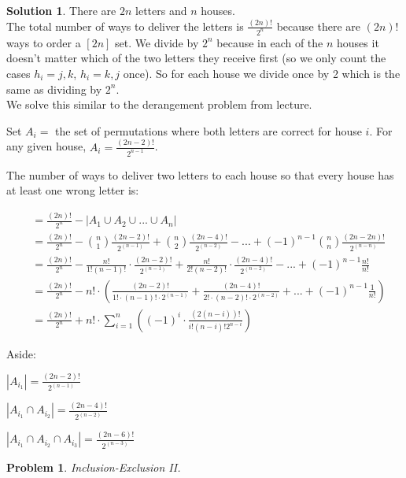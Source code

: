 \documentclass{article}
\newtheorem{problem}{Problem}
\theoremstyle{definition}
\newtheorem*{solution}{Solution}
\begin{document}
\begin{solution}

There are \(2n\) letters and \(n\) houses. \\

The total number of ways to deliver the letters is \(\frac{(2n)!}{2^n}\) because there are \((2n)!\) ways to order a \([2n]\) set. We divide by \(2^n\) because in each of the \(n\) houses it doesn't matter which of the two letters they receive first (so we only count the cases \(h_i={j,k}\), \(h_i={k,j}\) once). So for each house we divide once by 2 which is the same as dividing by \(2^n\). \\

We solve this similar to the derangement problem from lecture.

Set \(A_i=\) the set of permutations where both letters are correct for house \(i\). For any given house, \(A_i=\frac{(2n-2)!}{2^{n-1}}\).

The number of ways to deliver two letters to each house so that every house has at least one wrong letter is:

\begin{align*}
&= \frac{(2n)!}{2^n} - |A_1\cup A_2\cup ... \cup A_n| \\
&= \frac{(2n)!}{2^n} - {n \choose 1}\frac{(2n-2)!}{2^(n-1)}+{n \choose 2}\frac{(2n-4)!}{2^(n-2)}-...+(-1)^{n-1}{n \choose n}\frac{(2n-2n)!}{2^(n-n)} \\
&= \frac{(2n)!}{2^n} - \frac{n!}{1!(n-1)!}\cdot \frac{(2n-2)!}{2^(n-1)}+\frac{n!}{2!(n-2)!}\cdot \frac{(2n-4)!}{2^(n-2)}-...+(-1)^{n-1}\frac{n!}{n!} \\
&= \frac{(2n)!}{2^n} - n!\cdot (\frac{(2n-2)!}{1!\cdot (n-1)!\cdot 2^{(n-1)}}+\frac{(2n-4)!}{2!\cdot (n-2)!\cdot 2^{(n-2)}}+...+(-1)^{n-1}\frac{1}{n!}) \\
&= \frac{(2n)!}{2^n} + n! \cdot \sum\limits_{i=1}^n \left( (-1)^i\cdot \frac{(2(n-i))!}{i!(n-i)!2^{n-i}} \right)
\end{align*}

Aside:

\(|A_{i_1}|=\frac{(2n-2)!}{2^(n-1)}\)

\(|A_{i_1}\cap A_{i_2}|=\frac{(2n-4)!}{2^(n-2)}\)

\(|A_{i_1}\cap A_{i_2}\cap A_{i_3}|=\frac{(2n-6)!}{2^(n-3)}\)

\end{solution}

\begin{problem} 

Inclusion-Exclusion II.

\end{problem}
\end{document}
